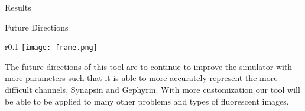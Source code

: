 \documentclass[final]{beamer}
\newlength{\onecolwid}
\begin{document}
\begin{frame}[t]
\begin{columns}[t]
\begin{column}{\onecolwid}
\begin{block}{Results}
    \begin{block}{Future Directions}

        \begin{wrapfigure}{r}{0.1\textwidth}
        \centering
    \texttt{[image: frame.png]}
\end{wrapfigure}
    The future directions of this tool are to continue to improve the simulator with more parameters such that it is able to more accurately represent the more difficult channels, Synapsin and Gephyrin. With more customization our tool will be able to be applied to many other problems and types of fluorescent images.

    \end{block}

\end{block}
\end{column}

\end{columns}
\end{frame} %
\end{document}
